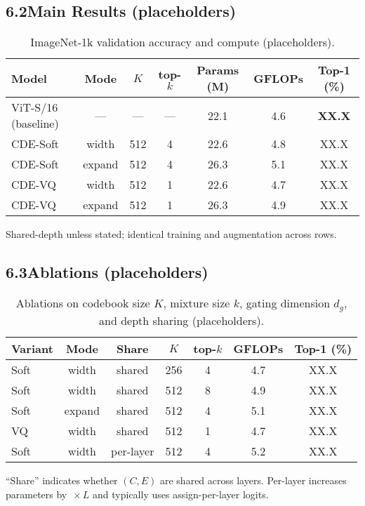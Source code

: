 \documentclass[11pt]{article}
\begin{document}
\subsection*{6.2\quad Main Results (placeholders)}
\begin{table}[t]
\centering
\begin{threeparttable}
\caption{ImageNet-1k validation accuracy and compute (placeholders).}
\label{tab:main}
\begin{tabular}{lcccccc}
\toprule
Model & Mode & $K$ & top-$k$ & Params (M) & GFLOPs & Top-1 (\%) \\
\midrule
ViT-S/16 (baseline) & ---    & --- & --- & 22.1 & 4.6 & \textbf{XX.X} \\
CDE-Soft            & width  & 512 & 4   & 22.6 & 4.8 & XX.X \\
CDE-Soft            & expand & 512 & 4   & 26.3 & 5.1 & XX.X \\
CDE-VQ              & width  & 512 & 1   & 22.6 & 4.7 & XX.X \\
CDE-VQ              & expand & 512 & 1   & 26.3 & 4.9 & XX.X \\
\bottomrule
\end{tabular}
\begin{tablenotes}\footnotesize
\item Shared-depth unless stated; identical training and augmentation across rows.
\end{tablenotes}
\end{threeparttable}
\end{table}

\subsection*{6.3\quad Ablations (placeholders)}
\begin{table}[t]
\centering
\begin{threeparttable}
\caption{Ablations on codebook size $K$, mixture size $k$, gating dimension $d_g$, and depth sharing (placeholders).}
\label{tab:ablations}
\begin{tabular}{lcccccc}
\toprule
Variant & Mode & Share & $K$ & top-$k$ & GFLOPs & Top-1 (\%) \\
\midrule
Soft & width  & shared    & 256  & 4  & 4.7 & XX.X \\
Soft & width  & shared    & 512  & 8  & 4.9 & XX.X \\
Soft & expand & shared    & 512  & 4  & 5.1 & XX.X \\
VQ   & width  & shared    & 512  & 1  & 4.7 & XX.X \\
Soft & width  & per-layer & 512  & 4  & 5.2 & XX.X \\
\bottomrule
\end{tabular}
\begin{tablenotes}\footnotesize
\item ``Share'' indicates whether $(C,E)$ are shared across layers. Per-layer increases parameters by $\,\times L$ and typically uses assign-per-layer logits.
\end{tablenotes}
\end{threeparttable}
\end{table}
\end{document}
